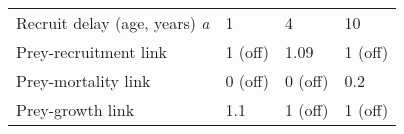 \documentclass[]{article}
\begin{document}
\begin{longtable}[]{@{}llll@{}}
\begin{minipage}[t]{0.56\columnwidth}
Recruit delay (age, years) \emph{a}\strut
\end{minipage} & \begin{minipage}[t]{0.11\columnwidth}\raggedright\strut
1\strut
\end{minipage} & \begin{minipage}[t]{0.11\columnwidth}\raggedright\strut
4\strut
\end{minipage} & \begin{minipage}[t]{0.11\columnwidth}\raggedright\strut
10\strut
\end{minipage}\tabularnewline
\begin{minipage}[t]{0.56\columnwidth}\raggedright\strut
Prey-recruitment link\strut
\end{minipage} & \begin{minipage}[t]{0.11\columnwidth}\raggedright\strut
1 (off)\strut
\end{minipage} & \begin{minipage}[t]{0.11\columnwidth}\raggedright\strut
1.09\strut
\end{minipage} & \begin{minipage}[t]{0.11\columnwidth}\raggedright\strut
1 (off)\strut
\end{minipage}\tabularnewline
\begin{minipage}[t]{0.56\columnwidth}\raggedright\strut
Prey-mortality link\strut
\end{minipage} & \begin{minipage}[t]{0.11\columnwidth}\raggedright\strut
0 (off)\strut
\end{minipage} & \begin{minipage}[t]{0.11\columnwidth}\raggedright\strut
0 (off)\strut
\end{minipage} & \begin{minipage}[t]{0.11\columnwidth}\raggedright\strut
0.2\strut
\end{minipage}\tabularnewline
\begin{minipage}[t]{0.56\columnwidth}\raggedright\strut
Prey-growth link\strut
\end{minipage} & \begin{minipage}[t]{0.11\columnwidth}\raggedright\strut
1.1\strut
\end{minipage} & \begin{minipage}[t]{0.11\columnwidth}\raggedright\strut
1 (off)\strut
\end{minipage} & \begin{minipage}[t]{0.11\columnwidth}\raggedright\strut
1 (off)\strut
\end{minipage}\tabularnewline
\bottomrule
\end{longtable}
\end{document}
